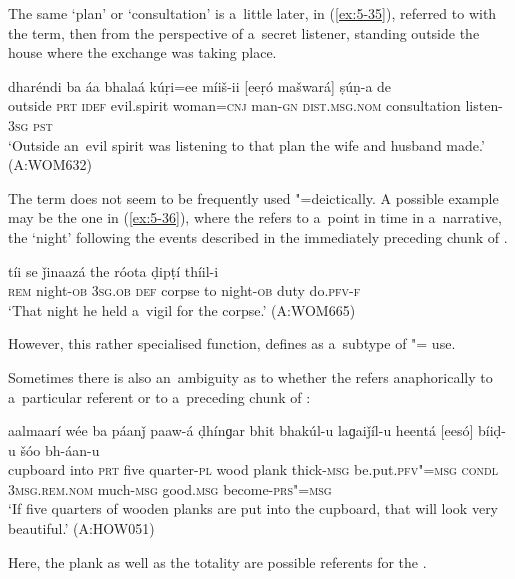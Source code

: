 The same `plan' or `consultation' is a~little later, in (\ref{ex:5-35}), referred to with the  term, then from the perspective of a~secret listener, standing outside the house where the exchange was taking place.
\begin{exe}
\ex
\label{ex:5-35}
\gll dharéndi ba áa bhalaá kúṛi=ee míiš-ii [eeṛó mašwará] ṣúṇ-a de \\
outside \textsc{prt} \textsc{idef} evil.spirit woman=\textsc{cnj} man-\textsc{gn} \textsc{dist.msg.nom} consultation listen-\textsc{3sg} \textsc{pst} \\
\glt `Outside an~evil spirit was listening to that plan the wife and husband made.' (A:WOM632)
\end{exe}
The  term does not seem to be frequently used "=deictically. A possible example may be the one in (\ref{ex:5-36}), where the  refers to a~point in time in a~narrative, the `night' following the events described in the immediately preceding chunk of .
\begin{exe}
\ex
\label{ex:5-36}
 tíi se ǰinaazá the róota ḍipṭí thíil-i\\
\textsc{rem} night-\textsc{ob} \textsc{3sg.ob} \textsc{def} corpse to night-\textsc{ob} duty do.\textsc{pfv-f}\\
\glt `That night he held a~vigil for the corpse.' (A:WOM665)
\end{exe}
However, this rather specialised function, \citet[225]{himmelmann1996} defines as a~subtype of "= use.

Sometimes there is also an~ambiguity as to whether the  refers anaphorically to a~particular  referent or to a~preceding chunk of :

\begin{exe}
\ex
\label{ex:5-37}
\gll aalmaarí wée ba páanǰ paaw-á ḍhínɡar bhit bhakúl-u laɡaiǰíl-u heentá [eesó] bíiḍ-u šóo bh-áan-u \\
cupboard into \textsc{prt} five quarter-\textsc{pl} wood plank thick-\textsc{msg} be.put.\textsc{pfv"=msg} \textsc{condl} \textsc{3msg.rem.nom} much-\textsc{msg} good.\textsc{msg} become-\textsc{prs"=msg}\\
\glt `If five quarters of wooden planks are put into the cupboard, that will look very beautiful.'
(A:HOW051)
\end{exe}

Here, the plank as well as the totality are possible referents for the .

